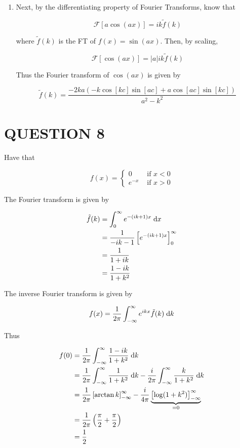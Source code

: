 \documentclass[a4paper]{article}
\begin{document}
\begin{enumerate}
	\item Next, by the differentiating property of Fourier Transforms, know that
	
	\[ \mathcal{F}[a\cos(ax)] = ik\tilde{f}(k) \]
	
	where $ \tilde{f}(k) $ is the FT of $ f(x) = \sin(ax) $. Then, by scaling,
	
	\[ \mathcal{F}[\cos(ax)] = | a | ik\tilde{f}(k) \]
	
	Thus the Fourier transform of $ \cos(ax) $ is given by
	
	\[ \tilde{f}(k) = \frac{-2ka \left(  - k \cos[kc]\sin[ac] + a \cos[ac]\sin[kc]   \right)}{a^{2} - k^{2}}  \]
	
	
	
\end{enumerate}

\section{QUESTION 8}

Have that

\[ f(x) = \begin{cases} 0  & \text{ if } x < 0 \\ e^{-x} & \text{ if } x > 0 \end{cases} \]

The Fourier transform is given by 

\begin{align*}
\tilde{f}(k) & = \int_{0}^{\infty} e^{-(ik + 1)x} \; \mathrm{d} x   \\
& = \frac{1}{-ik - 1}\left[  e^{-(ik + 1)x} \right]_{0}^{\infty} \\
& = \frac{1}{1 + ik } \\
& = \frac{1 - ik}{1 + k^{2}}
 \end{align*}
 
The inverse Fourier transform is given by

\[ f(x) = \frac{1}{2\pi} \int_{-\infty}^{\infty} e^{ikx} \tilde{f}(k) \; \mathrm{d} k  \]

Thus

\begin{align*}
f(0) & = \frac{1}{2\pi} \int_{-\infty}^{\infty}\frac{1 - ik}{1 + k^{2}} \; \mathrm{d} k   \\
& = \frac{1}{2\pi} \int_{-\infty}^{\infty} \frac{1}{1 + k^{2}} \; \mathrm{d} k  -  \frac{i}{2\pi} \int_{-\infty}^{\infty}  \frac{k}{1 + k^{2}} \; \mathrm{d} k   \\
& = \frac{1}{2\pi} \left[  \arctan k \right]_{-\infty}^{\infty} - \frac{i}{4\pi} \underbrace{\left[  \log (1 + k^{2}) \right]_{-\infty}^{\infty}}_{=0}  \\
& = \frac{1}{2\pi} \left(  \frac{\pi}{2} + \frac{\pi}{2} \right) \\
& = \frac{1}{2}
\end{align*}
\end{document}
